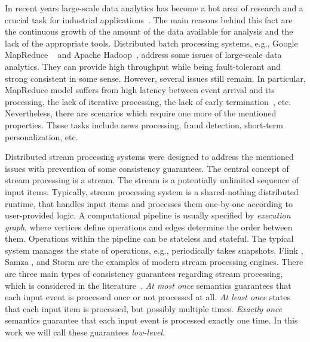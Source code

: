 
\label {fs-phd-intro}

In recent years large-scale data analytics has become a hot area of research and a crucial task for industrial applications~\cite{Zou:2010:SRQ:1920841.1921012}. The main reasons behind this fact are the continuous growth of the amount of the data available for analysis and the lack of the appropriate tools. Distributed batch processing systems, e.g., Google MapReduce ~\cite{Dean:2008:MSD:1327452.1327492} and Apache Hadoop~\cite{hadoop2009hadoop}, address some issues of large-scale data analytics. They can provide high throughput while being fault-tolerant and strong consistent in some sense. However, several issues still remain. In particular, MapReduce model suffers from high latency between event arrival and its processing, the lack of iterative processing, the lack of early termination~\cite{Doulkeridis:2014:SLA:2628707.2628782}, etc. Nevertheless, there are scenarios which require one more of the mentioned properties. These tasks include news processing, fraud detection, short-term personalization, etc.

Distributed stream processing systems were designed to address the mentioned issues with prevention of some consistency guarantees. The central concept of stream processing is a stream. The stream is a potentially unlimited sequence of input items. Typically, stream processing system is a shared-nothing distributed runtime, that handles input items and processes them one-by-one according to user-provided logic. A computational pipeline is usually specified by {\em execution graph}, where vertices define operations and edges determine the order between them. Operations within the pipeline can be stateless and stateful. The typical system manages the state of operations, e.g., periodically takes snapshots. Flink \cite{carbone2015apache}, Samza \cite{Noghabi:2017:SSS:3137765.3137770}, and Storm \cite{apache:storm} are the examples of modern stream processing engines. There are three main types of consistency guarantees regarding stream processing, which is considered in the literature~\cite{Kulkarni:2015:THS:2723372.2742788, Akidau:2013:MFS:2536222.2536229, Carbone:2017:SMA:3137765.3137777}. {\em At most once} semantics guarantees that each input event is processed once or not processed at all. {\em At least once} states that each input item is processed, but possibly multiple times. {\em Exactly once} semantics guarantee that each input event is processed exactly one time. In this work we will call these guarantees {\em low-level}. 

